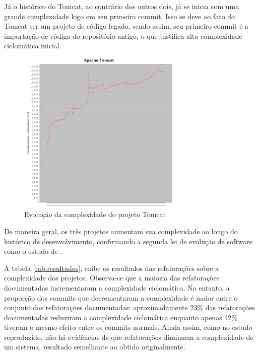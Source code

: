 \documentclass[a4paper, 12pt, twoside]{book}
\begin{document}
        Já o histórico do Tomcat, ao contrário dos outros dois, já se inicia com uma grande complexidade logo em seu primeiro commit. Isso se deve ao fato do Tomcat ser um projeto de código legado, sendo assim, seu primeiro commit é a importação de código do repositório antigo, o que justifica alta complexidade ciclomática inicial.

        \begin{figure}[ht]
            \centering
            \includegraphics[width=0.7\textwidth]{img/graficos/tomcat.png}
            \caption{Evolução da complexidade do projeto Tomcat}
            \label{fig:cc-tomcat}
        \end{figure}

        De maneira geral, os três projetos aumentam sua complexidade ao longo do histórico de desenvolvimento, confirmando a segunda lei de evolução de software como o estudo de \cite{SoetensQUATIC2010}. 

        A tabela \ref{tab:resultados}, exibe os resultados das refatorações sobre a complexidade dos projetos. Observa-se que a maioria das refatorações documentadas incrementaram a complexidade ciclomática. No entanto, a proporção dos commits que decrementaram a complexidade é maior entre o conjunto das refatorações documentadas: aproximadamente 23\% das refatorações documentadas reduziram a complexidade ciclomática enquanto apenas 12\% tiveram o mesmo efeito entre os commits normais. Ainda assim, como no estudo reproduzido, não há evidências de que refatorações diminuem a complexidade de um sistema, resultado semelhante ao obtido originalmente.
\end{document}
